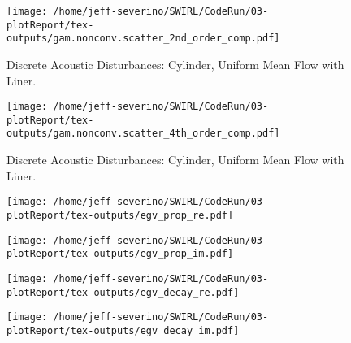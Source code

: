 \documentclass{article}
\begin{document}
 \begin{figure}
     \centering
     \texttt{[image: /home/jeff-severino/SWIRL/CodeRun/03-plotReport/tex-outputs/gam.nonconv.scatter\_2nd\_order\_comp.pdf]}
     \caption{Discrete Acoustic Disturbances: Cylinder, Uniform Mean Flow with Liner.}
 \end{figure}
 
 



 \begin{figure}
     \centering
     \texttt{[image: /home/jeff-severino/SWIRL/CodeRun/03-plotReport/tex-outputs/gam.nonconv.scatter\_4th\_order\_comp.pdf]}
     \caption{Discrete Acoustic Disturbances: Cylinder, Uniform Mean Flow with Liner.}
 \end{figure}
 
 


 \begin{figure}
     \centering
     \texttt{[image: /home/jeff-severino/SWIRL/CodeRun/03-plotReport/tex-outputs/egv\_prop\_re.pdf]}
 \end{figure}

 \begin{figure}
     \centering
     \texttt{[image: /home/jeff-severino/SWIRL/CodeRun/03-plotReport/tex-outputs/egv\_prop\_im.pdf]}
 \end{figure}

 \begin{figure}
     \centering
     \texttt{[image: /home/jeff-severino/SWIRL/CodeRun/03-plotReport/tex-outputs/egv\_decay\_re.pdf]}
 \end{figure}

 \begin{figure}
     \centering
     \texttt{[image: /home/jeff-severino/SWIRL/CodeRun/03-plotReport/tex-outputs/egv\_decay\_im.pdf]}
 \end{figure}



\end{document}
